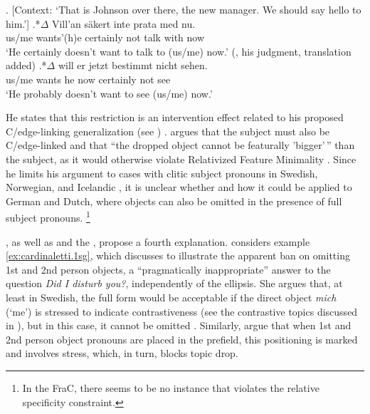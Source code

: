 \ex. [Context: `That is Johnson over there, the new manager. We should say hello to him.']
\ag.*$\Delta$ Vill'an säkert inte prata med nu.\label{ex:sigurdsson.obj}\\
us/me wants'(h)e certainly not talk with now\\
`He certainly doesn't want to talk to (us/me) now.'  (\cite[290]{sigurdsson2011}, his judgment, translation added)
\bg.*$\Delta$ will er jetzt bestimmt nicht sehen.\label{ex:sigurdsson.obj.dt}\\
us/me wants he now certainly not see\\
`He probably doesn't want to see (us/me) now.'


\largerpage[-2]
He states that this restriction is an intervention effect related to his proposed C/edge-linking generalization (see ) \citep[291]{sigurdsson2011}.
\citet[292]{sigurdsson2011} argues that the subject must also be C/edge-linked and that ``the dropped object cannot be featurally 'bigger'\,'' than the subject, as it would otherwise violate Relativized Feature Minimality \citep{rizzi2001}.
Since he limits his argument to cases with clitic subject pronouns in Swedish,  Norwegian,  and Icelandic  \citep[291, footnote 36]{sigurdsson2011},
it is unclear whether and how it could be applied to German and Dutch,  where objects can also be omitted in the presence of full subject pronouns.%
\footnote{In the FraC, there seems to be no instance that violates the relative specificity constraint.}

\citet{mornsjo2002}, as well as \citet{volodina.onea2012} and the \citet{duden2016, duden2022}, propose a fourth explanation.
\citet[70]{mornsjo2002} considers example \ref{ex:cardinaletti.1sg}, which \citet{cardinaletti1990} discusses to illustrate the apparent ban on omitting 1st and 2nd person objects, a ``pragmatically inappropriate'' answer to the question \textit{Did I disturb you?}, independently of the ellipsis.
She argues that, at least in Swedish,  the full form would be acceptable if the direct object \textit{mich} (`me') is stressed to indicate contrastiveness (see the contrastive topics  discussed in ), but in this case, it cannot be omitted \citep[71]{mornsjo2002}.
Similarly, \citet[219]{volodina.onea2012} argue that when 1st and 2nd person object pronouns are placed in the prefield, this positioning is marked and involves stress, which, in turn, blocks topic drop.

